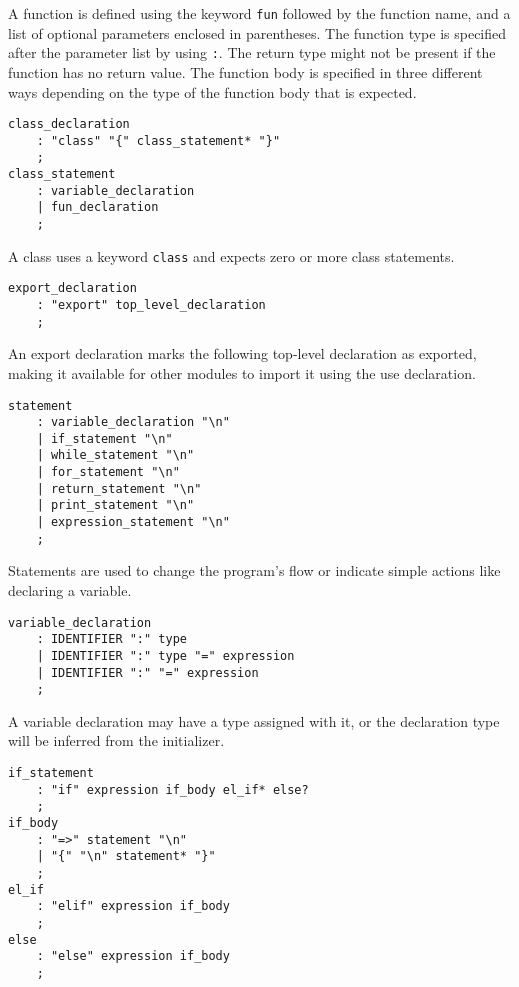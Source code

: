 A function is defined using the keyword \texttt{fun} followed by the function name, and a list of optional parameters enclosed in parentheses.
The function type is specified after the parameter list by using \texttt{:}. The return type might not be present if the function has no return value.
The function body is specified in three different ways depending on the type of the function body that is expected.

\begin{lstlisting}
class_declaration
    : "class" "{" class_statement* "}"
    ;
class_statement
    : variable_declaration
    | fun_declaration
    ;
\end{lstlisting}

A class uses a keyword \texttt{class} and expects zero or more class statements.

\begin{lstlisting}
export_declaration
    : "export" top_level_declaration
    ;
\end{lstlisting}

An export declaration marks the following top-level declaration as exported, making it available for other modules to import it using the
use declaration.

\begin{lstlisting}
statement
    : variable_declaration "\n"
    | if_statement "\n"
    | while_statement "\n"
    | for_statement "\n"
    | return_statement "\n"
    | print_statement "\n"
    | expression_statement "\n"
    ;
\end{lstlisting}

Statements are used to change the program's flow or indicate simple actions like declaring a variable.

\begin{lstlisting}
variable_declaration
    : IDENTIFIER ":" type
    | IDENTIFIER ":" type "=" expression
    | IDENTIFIER ":" "=" expression
    ;
\end{lstlisting}

A variable declaration may have a type assigned with it, or the declaration type will be inferred from the initializer.

\begin{lstlisting}
if_statement
    : "if" expression if_body el_if* else?
    ;
if_body
    : "=>" statement "\n"
    | "{" "\n" statement* "}"
    ;
el_if
    : "elif" expression if_body
    ;
else
    : "else" expression if_body
    ;
\end{lstlisting}

